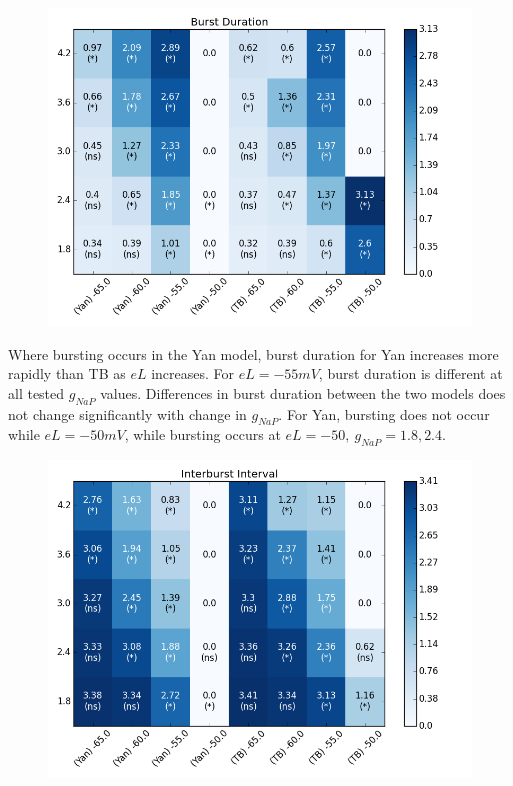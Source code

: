 \documentclass[11pt]{article}
\begin{document}
\begin{figure}
\centering
\includegraphics[scale=.4]{heatmap_Burst_Duration.png}
\end{figure}

Where bursting occurs in the Yan model, burst duration for Yan increases more rapidly than TB as $eL$ increases. For $eL=-55 mV$, burst duration is different at all tested $g_{NaP}$ values.
Differences in burst duration between the two models does not change significantly with change in $g_{NaP}$. For Yan, bursting does not occur while $eL = -50 mV$, while bursting occurs at $eL=-50,\  g_{NaP}=1.8, 2.4$. 

\begin{figure}
\begin{center}
\includegraphics[scale=.4]{heatmap_Interburst_Interval.png}
\end{center}
\end{figure}
\end{document}

